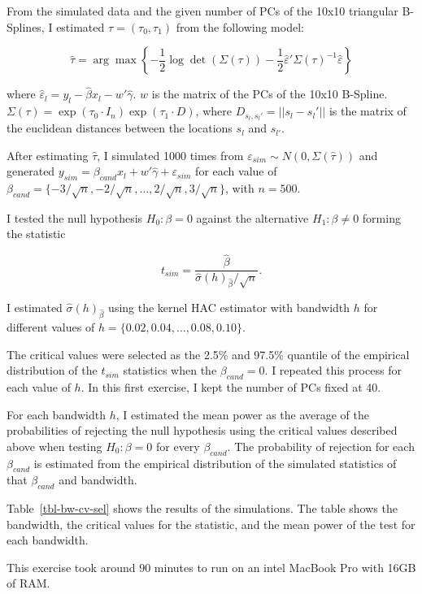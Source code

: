 \documentclass[
]{article}
\begin{document}
From the simulated data and the given number of PCs of the 10x10
triangular B-Splines, I estimated \(\tau = (\tau_0, \tau_1)\) from the
following model:

\[
  \hat\tau = \arg \max \left\{ -\frac{1}{2} \log\det(\Sigma(\tau))-\frac{1}{2}\hat\varepsilon'\Sigma(\tau)^{-1}\hat\varepsilon \right\}
\]

where \(\hat\varepsilon_l = y_l - \hat\beta x_l-w'\hat\gamma\). \(w\) is
the matrix of the PCs of the 10x10 B-Spline.
\(\Sigma(\tau)=\exp(\tau_0\cdot I_n)\exp(\tau_1\cdot D)\), where
\(D_{s_l,s_l'}=||s_l - s_l'||\) is the matrix of the euclidean distances
between the locations \(s_l\) and \(s_{l'}\).

After estimating \(\hat\tau\), I simulated 1000 times from
\(\varepsilon_{sim} \sim N(0,\Sigma(\hat\tau))\) and generated
\(y_{sim }= \beta_{cand} x_l  + w'\hat\gamma + \varepsilon_{sim}\) for
each value of
\(\beta_{cand} = \{-3/\sqrt{n}, -2/\sqrt{n}, \dots, 2/\sqrt{n}, 3/\sqrt{n}\}\),
with \(n=500\).

I tested the null hypothesis \(H_0: \beta = 0\) against the alternative
\(H_1: \beta \not= 0\) forming the statistic

\[
t_{sim} = \frac{\hat\beta}{\hat\sigma(h)_{\hat\beta}/\sqrt{n}} .
\]

I estimated \(\hat\sigma(h)_{\hat\beta}\) using the kernel HAC estimator
with bandwidth \(h\) for different values of
\(h=\{0.02, 0.04, \dots, 0.08, 0.10\}\).

The critical values were selected as the 2.5\% and 97.5\% quantile of
the empirical distribution of the \(t_{sim}\) statistics when the
\(\beta_{cand} = 0\). I repeated this process for each value of \(h\).
In this first exercise, I kept the number of PCs fixed at 40.

For each bandwidth \(h\), I estimated the mean power as the average of
the probabilities of rejecting the null hypothesis using the critical
values described above when testing \(H_0: \beta = 0\) for every
\(\beta_{cand}\). The probability of rejection for each \(\beta_{cand}\)
is estimated from the empirical distribution of the simulated statistics
of that \(\beta_{cand}\) and bandwidth.

Table~\ref{tbl-bw-cv-sel} shows the results of the simulations. The
table shows the bandwidth, the critical values for the statistic, and
the mean power of the test for each bandwidth.

This exercise took around 90 minutes to run on an intel MacBook Pro with
16GB of RAM.
\end{document}
